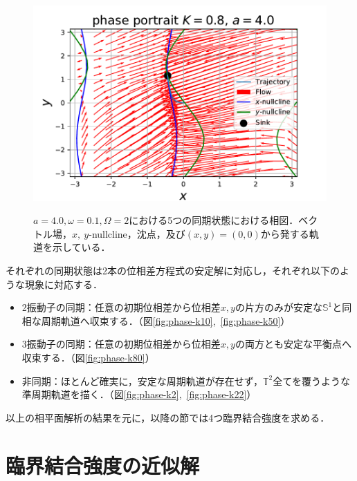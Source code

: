 \documentclass[../main]{subfiles}
\begin{document}
\begin{figure}[t]
    \begin{minipage}[b]{0.47\linewidth}
      \centering
      \includegraphics[keepaspectratio, scale=0.42]{images/phase_a4K80.pdf}
      \label{fig:phase-k80}
    \end{minipage}
    \caption{$a=4.0,\omega=0.1,\Omega=2$における5つの同期状態における相図．ベクトル場，$x,\ y$-nullcline，沈点，及び$(x,y)=(0,0)$から発する軌道を示している．}\label{fig:phase}
\end{figure}

それぞれの同期状態は2本の位相差方程式の安定解に対応し，それぞれ以下のような現象に対応する．
\begin{itemize}
    \item 
    2振動子の同期：任意の初期位相差から位相差$x,y$の片方のみが安定な$\mathbb{S}^1$と同相な周期軌道へ収束する．（図\ref{fig:phase-k10},\ \ref{fig:phase-k50}）
    \item
    3振動子の同期：任意の初期位相差から位相差$x,y$の両方とも安定な平衡点へ収束する．（図\ref{fig:phase-k80}）
    \item
    非同期：ほとんど確実に，安定な周期軌道が存在せず，$\mathbb{T}^2$全てを覆うような準周期軌道を描く．（図\ref{fig:phase-k2},\ \ref{fig:phase-k22}）
\end{itemize}
以上の相平面解析の結果を元に，以降の節では4つ臨界結合強度を求める．
\section{臨界結合強度の近似解}
\label{sec:3body-critical}
\end{document}
